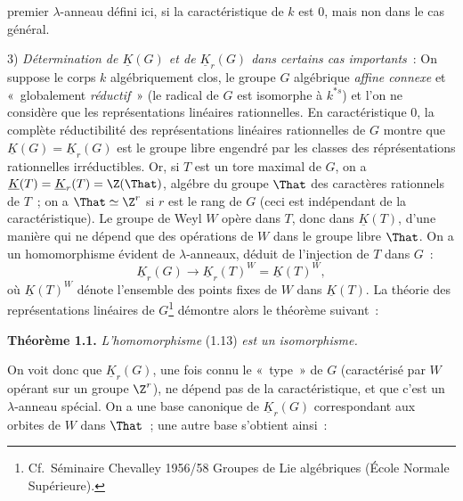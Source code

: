 premier $\lambda$-anneau défini ici, si la caractéristique de $k$ est $0$, mais non dans le cas général.

3) \emph{Détermination de $\underline{K}(G)$ et de $\underline{K}_r(G)$ dans certains cas importants}~: On suppose le corps $k$ algébriquement clos, le groupe $G$ algébrique \emph{affine connexe} et «~globalement \emph{réductif}~» (le radical de $G$ est isomorphe à $k^{*s}$) et l'on ne considère que les représentations linéaires rationnelles. En caractéristique $0$, la complète réductibilité des représentations linéaires rationnelles de $G$ montre que $\underline{K}(G)=\underline{K}_r(G)$ est le groupe libre engendré par les classes des réprésentations rationnelles irréductibles. Or, si $T$ est un tore maximal de $G$, on a $\underline{K}(T)=\underline{K}_r(T)=\Z(\That)$, algébre du groupe $\That$ des caractères rationnels de $T$~; on a $\That\simeq\Z^r$ si $r$ est le rang de $G$ (ceci est indépendant de la caractéristique). Le groupe de Weyl $W$ opère dans $T$, donc dans $\underline{K}(T)$, d'une manière qui ne dépend que des opérations de $W$ dans le groupe libre $\That$. On a un homomorphisme évident de $\lambda$-anneaux, déduit de l'injection de $T$ dans $G$~:
\begin{equation}\tag{1.13}
\underline{K}_r(G)\longrightarrow \underline{K}_r(T)^W=\underline{K}(T)^W,
\end{equation}
où $\underline{K}(T)^W$ dénote l'ensemble des points fixes de $W$ dans $\underline{K}(T)$. La théorie des représentations linéaires de $G$\footnote{Cf.\ Séminaire Chevalley 1956/58 Groupes de Lie algébriques (École Normale Supérieure).} démontre alors le théorème suivant~:

\textbf{Théorème 1.1.} \emph{L'homomorphisme} (1.13) \emph{est un isomorphisme.}

On voit donc que $\underline{K}_r(G)$, une fois connu le «~type~» de $G$ (caractérisé par $W$ opérant sur un groupe $\Z^r$), ne dépend pas de la caractéristique, et que c'est un $\lambda$-anneau spécial. On a une base canonique de $\underline{K}_r(G)$ correspondant aux orbites de $W$ dans $\That$~; une autre base s'obtient ainsi~:
